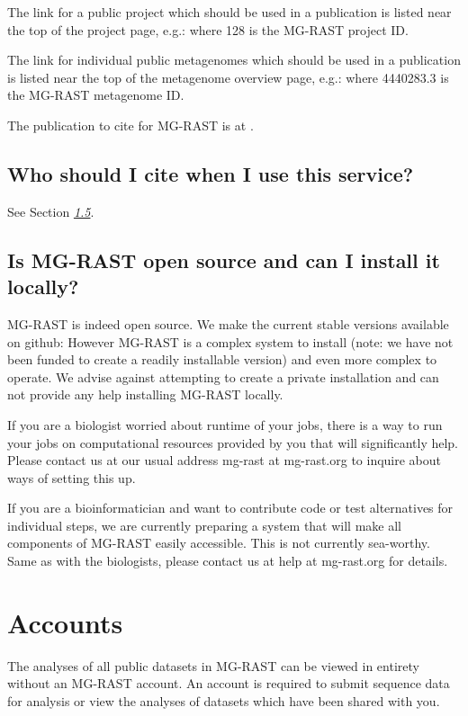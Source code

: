 \documentclass[letterpaper,10pt,english]{sphinxmanual}
\begin{document}
The link for a public project which should be used in a publication is
listed near the top of the project page, e.g.:
where 128 is the MG-RAST project ID.

The link for individual public metagenomes which should be used in a
publication is listed near the top of the metagenome overview page,
e.g.:
where 4440283.3 is the MG-RAST metagenome ID.

The publication to cite for MG-RAST is at
.


\subsection{Who should I cite when I use this service?}
\label{\detokenize{faq:who-should-i-cite-when-i-use-this-service}}
See Section {\hyperref[\detokenize{faq:section:MG-RAST-citation}]{\emph{1.5}}}.


\subsection{Is MG-RAST open source and can I install it locally?}
\label{\detokenize{faq:is-mg-rast-open-source-and-can-i-install-it-locally}}
MG-RAST is indeed open source. We make the current stable versions
available on github:  However MG-RAST is a
complex system to install (note: we have not been funded to create a
readily installable version) and even more complex to operate. We advise
against attempting to create a private installation and can not provide
any help installing MG-RAST locally.

If you are a biologist worried about runtime of your jobs, there is a
way to run your jobs on computational resources provided by you that
will significantly help. Please contact us at our usual address mg-rast
at mg-rast.org to inquire about ways of setting this up.

If you are a bioinformatician and want to contribute code or test
alternatives for individual steps, we are currently preparing a system
that will make all components of MG-RAST easily accessible. This is not
currently sea-worthy. Same as with the biologists, please contact us at
help at mg-rast.org for details.


\section{Accounts}
\label{\detokenize{faq:accounts}}
The analyses of all public datasets in MG-RAST can be viewed in entirety
without an MG-RAST account. An account is required to submit sequence
data for analysis or view the analyses of datasets which have been
shared with you.
\end{document}
